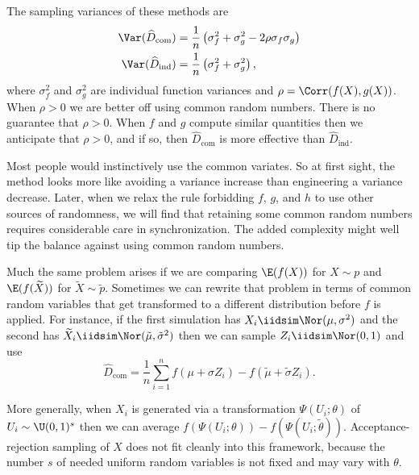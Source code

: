 The sampling variances of these methods are
\begin{equation}
	\begin{aligned}
		\Var(\widehat{D}_{\text{com}}) & = \frac{1}{n} \left(\sigma_f^2 + \sigma_g^2 - 2\rho\sigma_f\sigma_g\right) \\
		\Var(\widehat{D}_{\text{ind}}) & = \frac{1}{n} \left(\sigma_f^2 + \sigma_g^2\right),
	\end{aligned}
	\label{eq:8.21}
\end{equation}
where $\sigma_f^2$ and $\sigma_g^2$ are individual function variances and $\rho = \Corr(f(X), g(X))$. When $\rho > 0$ we are better off using common random numbers. There is no guarantee that $\rho > 0$. When $f$ and $g$ compute similar quantities then we anticipate that $\rho > 0$, and if so, then $\widehat{D}_{\text{com}}$ is more effective than $\widehat{D}_{\text{ind}}$.

Most people would instinctively use the common variates. So at first sight, the method looks more like avoiding a variance increase than engineering a variance decrease. Later, when we relax the rule forbidding $f$, $g$, and $h$ to use other sources of randomness, we will find that retaining some common random numbers requires considerable care in synchronization. The added complexity might well tip the balance against using common random numbers.

Much the same problem arises if we are comparing $\E(f(X))$ for $X \sim p$ and $\E(f(\widetilde{X}))$ for $\widetilde{X} \sim \tilde{p}$. Sometimes we can rewrite that problem in terms of common random variables that get transformed to a different distribution before $f$ is applied. For instance, if the first simulation has $X_i \iidsim \Nor(\mu, \sigma^2)$ and the second has $\widetilde{X}_i \iidsim \Nor(\tilde{\mu}, \tilde{\sigma}^2)$ then we can sample $Z_i \iidsim \Nor(0, 1)$ and use
\begin{equation*}
	\widehat{D}_{\text{com}} = \frac{1}{n} \sum_{i=1}^n f(\mu + \sigma Z_i) - f(\tilde{\mu} + \tilde{\sigma} Z_i).
\end{equation*}

More generally, when $X_i$ is generated via a transformation $\Psi(U_i; \theta)$ of $U_i \sim \U(0, 1)^s$ then we can average $f(\Psi(U_i; \theta)) - f(\Psi(U_i; \widetilde{\theta}))$.
Acceptance-rejection sampling of $X$ does not fit cleanly into this framework, because the number $s$ of needed uniform random variables is not fixed and may vary with $\theta$.

